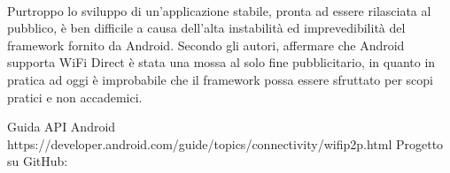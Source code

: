 \documentclass{llncs}
\begin{document}
\paragraph{} Purtroppo lo sviluppo di un'applicazione stabile, pronta ad essere rilasciata al pubblico, è ben difficile a causa dell'alta instabilità ed imprevedibilità del framework fornito da Android. Secondo gli autori, affermare che Android supporta WiFi Direct è stata una mossa al solo fine pubblicitario, in quanto in pratica ad oggi è improbabile che il framework possa essere sfruttato per scopi pratici e non accademici.


\begin{thebibliography}{}
	 Guida API Android https://developer.android.com/guide/topics/connectivity/wifip2p.html
	 Progetto su GitHub:
\end{thebibliography}
\end{document}

